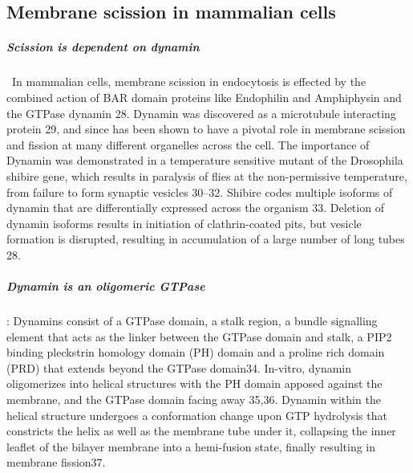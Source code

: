 	\subsection{Membrane scission in mammalian cells}
		\subparagraph{Scission is dependent on dynamin} 
\mbox{} \
		 In mammalian cells, membrane scission in endocytosis is effected by the combined action of BAR domain proteins like Endophilin and Amphiphysin and the GTPase dynamin 28.  Dynamin was discovered as a microtubule interacting protein 29, and since has been shown to have a pivotal role in membrane scission and fission at many different organelles across the cell. The importance of Dynamin was demonstrated in a temperature sensitive mutant of the Drosophila shibire gene, which results in paralysis of flies at the non-permissive temperature, from failure to form synaptic vesicles 30–32. Shibire codes multiple isoforms of dynamin that are differentially expressed across the organism 33. Deletion of dynamin isoforms results in initiation of clathrin-coated pits, but vesicle formation is disrupted, resulting in accumulation of a large number of long tubes 28. \par 
\vspace{5mm}
		\subparagraph{Dynamin is an oligomeric GTPase}: 
Dynamins consist of a GTPase domain, a stalk region, a bundle signalling element that acts as the linker between the GTPase domain and stalk, a PIP2 binding pleckstrin homology domain (PH) domain and a proline rich domain (PRD) that extends beyond the GTPase domain34. In-vitro, dynamin oligomerizes into helical structures with the PH domain apposed against the membrane, and the GTPase domain facing away 35,36. Dynamin within the helical structure undergoes a conformation change upon GTP hydrolysis that constricts the helix as well as the membrane tube under it, collapsing the inner leaflet of the bilayer membrane into a hemi-fusion state, finally resulting in membrane fission37. \par 

